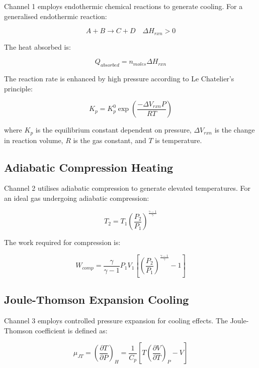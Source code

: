 \documentclass[12pt,a4paper]{article}
\begin{document}
Channel 1 employs endothermic chemical reactions to generate cooling. For a generalised endothermic reaction:

\begin{equation}
A + B \rightarrow C + D \quad \Delta H_{rxn} > 0
\end{equation}

The heat absorbed is:

\begin{equation}
Q_{absorbed} = n_{moles} \Delta H_{rxn}
\end{equation}

The reaction rate is enhanced by high pressure according to Le Chatelier's principle:

\begin{equation}
K_p = K_p^0 \exp\left(\frac{-\Delta V_{rxn} P}{RT}\right)
\end{equation}

where $K_p$ is the equilibrium constant dependent on pressure, $\Delta V_{rxn}$ is the change in reaction volume, $R$ is the gas constant, and $T$ is temperature.

\subsection{Adiabatic Compression Heating}

Channel 2 utilises adiabatic compression to generate elevated temperatures. For an ideal gas undergoing adiabatic compression:

\begin{equation}
T_2 = T_1 \left(\frac{P_2}{P_1}\right)^{\frac{\gamma-1}{\gamma}}
\end{equation}

The work required for compression is:

\begin{equation}
W_{comp} = \frac{\gamma}{\gamma-1} P_1 V_1 \left[\left(\frac{P_2}{P_1}\right)^{\frac{\gamma-1}{\gamma}} - 1\right]
\end{equation}

\subsection{Joule-Thomson Expansion Cooling}

Channel 3 employs controlled pressure expansion for cooling effects. The Joule-Thomson coefficient is defined as:

\begin{equation}
\mu_{JT} = \left(\frac{\partial T}{\partial P}\right)_H = \frac{1}{C_p}\left[T\left(\frac{\partial V}{\partial T}\right)_P - V\right]
\end{equation}
\end{document}
